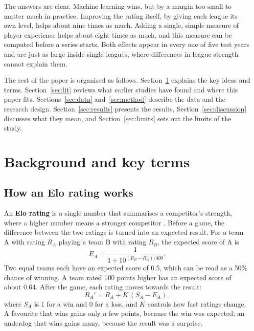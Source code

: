 \documentclass[12pt,a4paper]{article}
\begin{document}
The answers are clear. Machine learning wins, but by a margin too small to matter much in practice. Improving the rating itself, by giving each league its own level, helps about nine times as much. Adding a single, simple measure of player experience helps about eight times as much, and this measure can be computed before a series starts. Both effects appear in every one of five test years and are just as large inside single leagues, where differences in league strength cannot explain them.

The rest of the paper is organised as follows. Section~\ref{sec:background} explains the key ideas and terms. Section~\ref{sec:lit} reviews what earlier studies have found and where this paper fits. Sections~\ref{sec:data} and~\ref{sec:method} describe the data and the research design. Section~\ref{sec:results} presents the results, Section~\ref{sec:discussion} discusses what they mean, and Section~\ref{sec:limits} sets out the limits of the study.

\section{Background and key terms}\label{sec:background}

\subsection{How an Elo rating works}

An \textbf{Elo rating} is a single number that summarises a competitor's strength, where a higher number means a stronger competitor \citep{elo1978}. Before a game, the difference between the two ratings is turned into an expected result. For a team A with rating $R_A$ playing a team B with rating $R_B$, the expected score of A is
\begin{equation}
E_A = \frac{1}{1 + 10^{(R_B - R_A)/400}}.
\end{equation}
Two equal teams each have an expected score of 0.5, which can be read as a 50\% chance of winning. A team rated 100 points higher has an expected score of about 0.64. After the game, each rating moves towards the result:
\begin{equation}
R_A' = R_A + K\,(S_A - E_A),
\end{equation}
where $S_A$ is 1 for a win and 0 for a loss, and $K$ controls how fast ratings change. A favourite that wins gains only a few points, because the win was expected; an underdog that wins gains many, because the result was a surprise.
\end{document}
